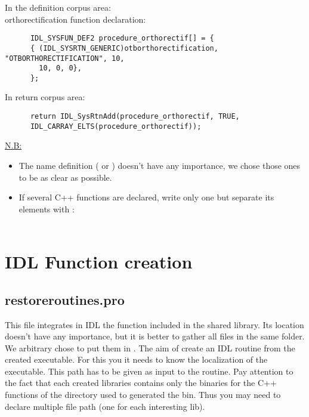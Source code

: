       In the definition corpus area:\\
      orthorectification function declaration:\\
\begin{verbatim}
      IDL_SYSFUN_DEF2 procedure_orthorectif[] = {
      { (IDL_SYSRTN_GENERIC)otborthorectification, "OTBORTHORECTIFICATION", 10, 
        10, 0, 0},
      };
\end{verbatim}
      In return corpus area: \\
\begin{verbatim}
      return IDL_SysRtnAdd(procedure_orthorectif, TRUE,
      IDL_CARRAY_ELTS(procedure_orthorectif));
\end{verbatim}

\underline{N.B:}
 \begin{itemize}
\item The name definition ( or ) doesn't have any importance, we chose those ones to be as clear as possible.
\item If several C++ functions are declared, write only one  but separate its elements with \code{\&\&}:\\
       \\
\end{itemize}


\section{IDL Function creation}
\label{idlfiles}
\subsection{restoreroutines.pro}
This file integrates in IDL the function included in the shared library. Its location doesn't have any importance, but it is better to gather all  files in the same folder.
We arbitrary chose to put them in .
The aim of create an IDL routine from the created executable. For this you it needs to know the localization of the executable. This path has to be given as input to the routine.
Pay attention to the fact that each created libraries contains only the binaries for the C++ functions of the directory used to generated the bin.
Thus you may need to declare multiple file path (one for each interesting lib).

